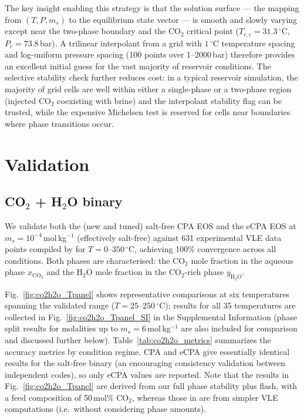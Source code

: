 \documentclass[preprint,12pt,authoryear]{elsarticle}
\begin{document}
The key insight enabling this strategy is that the solution surface --- the mapping from
$(T, P, m_s)$ to the equilibrium state vector --- is smooth and slowly varying except near
the two-phase boundary and the CO$_2$ critical point ($T_{c,c} = 31.3\,^\circ$C, $P_c = 73.8$\,bar).
A trilinear interpolant from a grid with $1\,^\circ$C temperature spacing and log-uniform pressure
spacing (100 points over 1--2000\,bar) therefore provides an excellent initial guess for the vast
majority of reservoir conditions.
The selective stability check further reduces cost: in a typical reservoir simulation, the
majority of grid cells are well within either a single-phase or a two-phase region (injected CO$_2$ coexisting with
brine) and the interpolant stability flag can be trusted, while the expensive Michelsen test
is reserved for cells near boundaries where phase transitions occur.


\section{Validation}
\label{sec:validation}

\subsection{CO$_2$ + H$_2$O binary}
\label{sec:co2h2o}

We validate both the (new and tuned) salt-free CPA EOS and the eCPA EOS at $m_s = 10^{-4}$\,mol\,kg$^{-1}$
(effectively salt-free) against 631 experimental VLE data points compiled by \citet{Coelho2025}
for $T = 0$--$350\,^\circ$C, achieving 100\% convergence across all conditions.
Both phases are characterised: the CO$_2$ mole fraction in the aqueous phase $x_{\text{CO}_2}$ and
the H$_2$O mole fraction in the CO$_2$-rich phase $y_{\text{H}_2\text{O}}$.

Fig.~\ref{fig:co2h2o_Tpanel} shows representative comparisons at six temperatures spanning
the validated range ($T = 25$--$250\,^\circ$C); results for all 35 temperatures are collected in
Fig.~\ref{fig:co2h2o_Tpanel_SI} in the Supplemental Information (phase split results for molalities up to $m_s = 6$\,mol\,kg$^{-1}$ are also included for comparison and discussed further below).
Table~\ref{tab:co2h2o_metrics} summarizes the accuracy metrics by condition regime.
CPA and eCPA give essentially identical results for the salt-free binary (an encouraging
consistency validation between independent codes), so only eCPA values are reported.
Note that the results in Fig.~\ref{fig:co2h2o_Tpanel} are derived from our full phase
stability plus flash, with a feed composition of 50\,mol\% CO$_2$, whereas those in
\citet{Coelho2025} are from simpler VLE computations (i.e.~without considering phase amounts).
\end{document}
